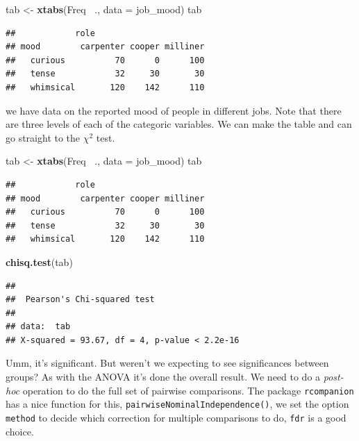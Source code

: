 \documentclass[
]{book}
\newenvironment{Shaded}{\begin{snugshade}}{\end{snugshade}}
\newcommand{\DataTypeTok}[1]{\textcolor[rgb]{0.13,0.29,0.53}{#1}}
\newcommand{\KeywordTok}[1]{\textcolor[rgb]{0.13,0.29,0.53}{\textbf{#1}}}
\newcommand{\NormalTok}[1]{#1}
\newcommand{\OperatorTok}[1]{\textcolor[rgb]{0.81,0.36,0.00}{\textbf{#1}}}
\newcommand{\StringTok}[1]{\textcolor[rgb]{0.31,0.60,0.02}{#1}}
\begin{document}
\begin{Shaded}
\begin{Highlighting}[]
\NormalTok{tab <-}\StringTok{ }\KeywordTok{xtabs}\NormalTok{(Freq }\OperatorTok{~}\NormalTok{., }\DataTypeTok{data =}\NormalTok{ job_mood)}
\NormalTok{tab}
\end{Highlighting}
\end{Shaded}

\begin{verbatim}
##            role
## mood        carpenter cooper milliner
##   curious          70      0      100
##   tense            32     30       30
##   whimsical       120    142      110
\end{verbatim}

we have data on the reported mood of people in different jobs. Note that there are three levels of each of the categoric variables. We can make the table and can go straight to the \(\chi^2\) test.

\begin{Shaded}
\begin{Highlighting}[]
\NormalTok{tab <-}\StringTok{ }\KeywordTok{xtabs}\NormalTok{(Freq }\OperatorTok{~}\NormalTok{., }\DataTypeTok{data =}\NormalTok{ job_mood)}
\NormalTok{tab}
\end{Highlighting}
\end{Shaded}

\begin{verbatim}
##            role
## mood        carpenter cooper milliner
##   curious          70      0      100
##   tense            32     30       30
##   whimsical       120    142      110
\end{verbatim}

\begin{Shaded}
\begin{Highlighting}[]
\KeywordTok{chisq.test}\NormalTok{(tab)}
\end{Highlighting}
\end{Shaded}

\begin{verbatim}
## 
## 	Pearson's Chi-squared test
## 
## data:  tab
## X-squared = 93.67, df = 4, p-value < 2.2e-16
\end{verbatim}

Umm, it's significant. But weren't we expecting to see significances between groups? As with the ANOVA it's done the overall result. We need to do a \emph{post-hoc} operation to do the full set of pairwise comparisons. The package \texttt{rcompanion} has a nice function for this, \texttt{pairwiseNominalIndependence()}, we set the option \texttt{method} to decide which correction for multiple comparisons to do, \texttt{fdr} is a good choice.
\end{document}
